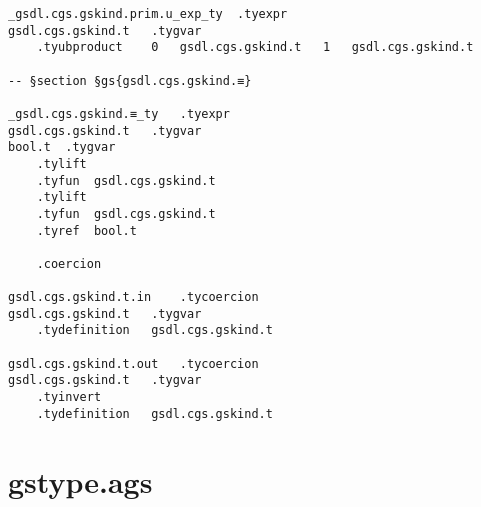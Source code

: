 \documentclass{report}
\begin{document}
\begin{verbatim}
_gsdl.cgs.gskind.prim.u_exp_ty	.tyexpr
gsdl.cgs.gskind.t	.tygvar
	.tyubproduct	0	gsdl.cgs.gskind.t	1	gsdl.cgs.gskind.t

-- §section §gs{gsdl.cgs.gskind.≡}

_gsdl.cgs.gskind.≡_ty	.tyexpr
gsdl.cgs.gskind.t	.tygvar
bool.t	.tygvar
	.tylift
	.tyfun	gsdl.cgs.gskind.t
	.tylift
	.tyfun	gsdl.cgs.gskind.t
	.tyref	bool.t

	.coercion

gsdl.cgs.gskind.t.in	.tycoercion
gsdl.cgs.gskind.t	.tygvar
	.tydefinition	gsdl.cgs.gskind.t

gsdl.cgs.gskind.t.out	.tycoercion
gsdl.cgs.gskind.t	.tygvar
	.tyinvert
	.tydefinition	gsdl.cgs.gskind.t
\end{verbatim}

\section{gstype.ags}
\end{document}
